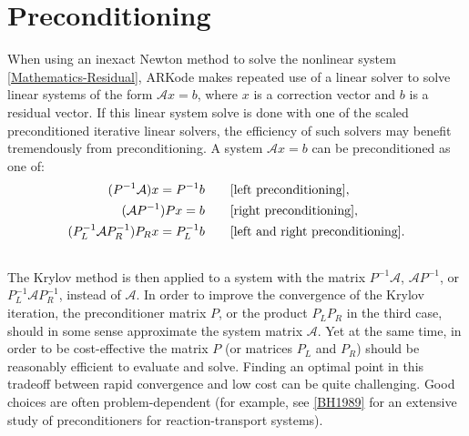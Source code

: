 \documentclass[letterpaper,10pt,english]{sphinxmanual}
\begin{document}
\section{Preconditioning}
\label{Mathematics:mathematics-preconditioning}\label{Mathematics:preconditioning}
When using an inexact Newton method to solve the nonlinear system
\eqref{Mathematics-Residual}, ARKode makes repeated use of a linear solver to solve
linear systems of the form ${\mathcal A}x = b$, where $x$ is a
correction vector and $b$ is a residual vector.  If this linear
system solve is done with one of the scaled preconditioned iterative
linear solvers, the efficiency of such solvers may benefit
tremendously from preconditioning. A system ${\mathcal A}x=b$ can be
preconditioned as one of:
\begin{gather}
\begin{split}(P^{-1}{\mathcal A})x = P^{-1}b & \qquad\text{[left preconditioning]}, \\
({\mathcal A}P^{-1})Px = b  & \qquad\text{[right preconditioning]}, \\
(P_L^{-1} {\mathcal A} P_R^{-1}) P_R x = P_L^{-1}b & \qquad\text{[left and right
preconditioning]}.\end{split}\notag\\\begin{split}\end{split}\notag
\end{gather}
The Krylov method is then applied to a system with the
matrix $P^{-1}{\mathcal A}$, ${\mathcal A}P^{-1}$, or
$P_L^{-1} {\mathcal A} P_R^{-1}$, instead of ${\mathcal
A}$.  In order to improve the convergence of the Krylov iteration, the
preconditioner matrix $P$, or the product $P_L P_R$ in the
third case, should in some sense approximate the system matrix
${\mathcal A}$.  Yet at the same time, in order to be
cost-effective the matrix $P$ (or matrices $P_L$ and
$P_R$) should be reasonably efficient to evaluate and solve.
Finding an optimal point in this tradeoff between rapid
convergence and low cost can be quite challenging.  Good choices are
often problem-dependent (for example, see {\hyperref[References:bh1989]{{[}BH1989{]}}} for an
extensive study of preconditioners for reaction-transport systems).
\end{document}
